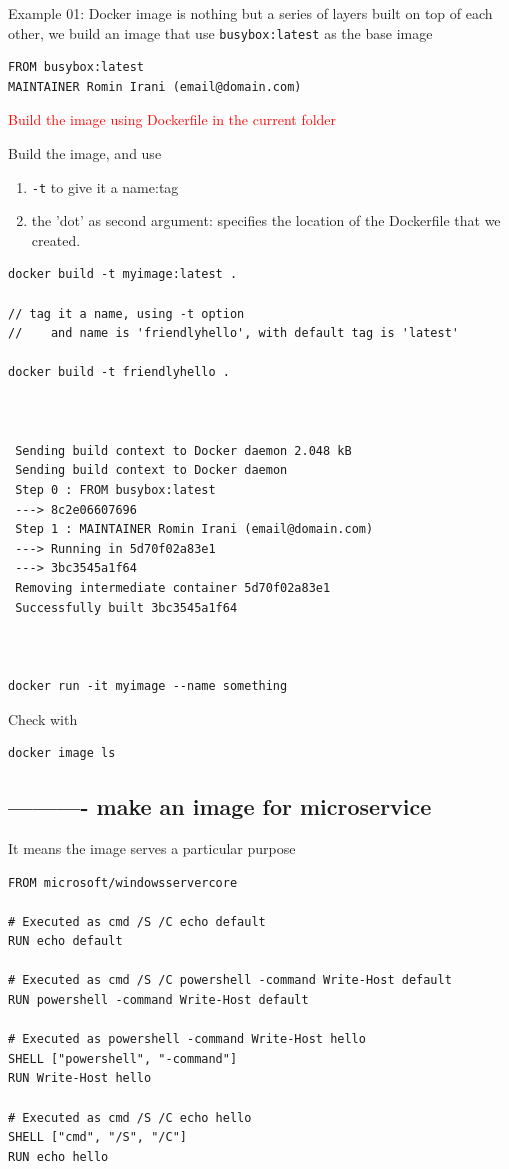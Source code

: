 Example 01: Docker image is nothing but a series of layers built on top of each other, we build an image that use
\verb!busybox:latest! as the base image
\begin{verbatim}
FROM busybox:latest
MAINTAINER Romin Irani (email@domain.com)
\end{verbatim}

\textcolor{red}{Build the image using Dockerfile in the current folder}

Build the image, and use 
\begin{enumerate}
  
  \item \verb!-t! to give it a name:tag
  
  \item the 'dot' as second argument: specifies the location of the Dockerfile that we created.
\end{enumerate}
\begin{verbatim}
docker build -t myimage:latest .

// tag it a name, using -t option
//    and name is 'friendlyhello', with default tag is 'latest'

docker build -t friendlyhello .



 Sending build context to Docker daemon 2.048 kB
 Sending build context to Docker daemon
 Step 0 : FROM busybox:latest
 ---> 8c2e06607696
 Step 1 : MAINTAINER Romin Irani (email@domain.com)
 ---> Running in 5d70f02a83e1
 ---> 3bc3545a1f64
 Removing intermediate container 5d70f02a83e1
 Successfully built 3bc3545a1f64
 
 
 
docker run -it myimage --name something
\end{verbatim}

Check with
\begin{verbatim}
docker image ls
\end{verbatim}

\subsection{---------- make an image for microservice}

It means the image serves a particular purpose


\begin{verbatim}
FROM microsoft/windowsservercore

# Executed as cmd /S /C echo default
RUN echo default

# Executed as cmd /S /C powershell -command Write-Host default
RUN powershell -command Write-Host default

# Executed as powershell -command Write-Host hello
SHELL ["powershell", "-command"]
RUN Write-Host hello

# Executed as cmd /S /C echo hello
SHELL ["cmd", "/S", "/C"]
RUN echo hello
\end{verbatim}


